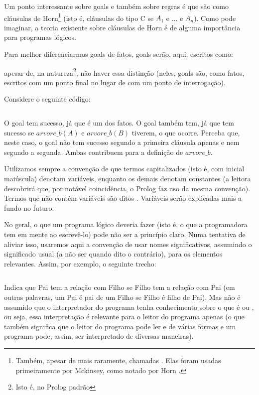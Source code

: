 Um ponto interessante sobre goals e também sobre regras é que são como cláusulas de
Horn\footnote{Também, apesar de mais raramente, chamadas . Elas
  foram usadas primeiramente por Mckinsey, como notado por Horn \cite{horn}.} (isto é, cláusulas do
tipo C se $A_1$ e ... e $A_n$). Como pode imaginar, a teoria existente sobre cláusulas de Horn é de
alguma importância para programas lógicos.

Para melhor diferenciarmos goals de fatos, goals serão, aqui, escritos como:

\noindent apesar de, na natureza\footnote{Isto é, no Prolog padrão}, não haver essa distinção (neles, goals são, como fatos,
escritos com um ponto final no lugar de com um ponto de interrogação).


Considere o seguinte código:\\

\inputminted{prolog}{../Exemplos/Cap0/prog3_arvb.pl}\label{lst:arvb}

O goal  tem sucesso, já que é um dos fatos. O goal  também tem, já que  tem sucesso se $arvore\_b(A)$ e $arvore\_b(B)$ tiverem, o que ocorre. Perceba que, neste caso, o goal não tem sucesso segundo a primeira cláusula apenas e nem segundo a segunda. Ambas contribuem para a definição de $arvore\_b$.

Utilizamos sempre a convenção de que termos capitalizados (isto é, com inicial maiúscula) denotam
variáveis, enquanto os demais denotam constantes (a leitora descobrirá que, por notável
coincidência, o Prolog faz uso da mesma convenção). Termos que não
contém variáveis são ditos . Variáveis serão explicadas mais a fundo no futuro.

No geral, o que um programa lógico deveria fazer (isto é, o que a programadora tem em mente ao escrevê-lo) pode não ser a princípio claro. Numa tentativa de aliviar isso, usaremos aqui a convenção de usar nomes significativos, assumindo o significado usual (a não ser quando dito o contrário), para os elementos relevantes. Assim, por exemplo, o seguinte trecho:

\inputminted{prolog}{../Exemplos/Cap0/prog4_pai.pl}\label{lst:pai_filho}


Indica que Pai tem a relação  com Filho se Filho tem a relação  com Pai (em outras palavras, um Pai é pai de um Filho se Filho é filho de Pai). Mas não é assumido que o interpretador do programa tenha conhecimento sobre o que é  ou , ou seja, essa interpretação é relevante para o leitor do programa apenas (o que também significa que o leitor do programa pode ler  e  de várias formas e um programa pode, assim,
ser interpretado de diversas maneiras).

